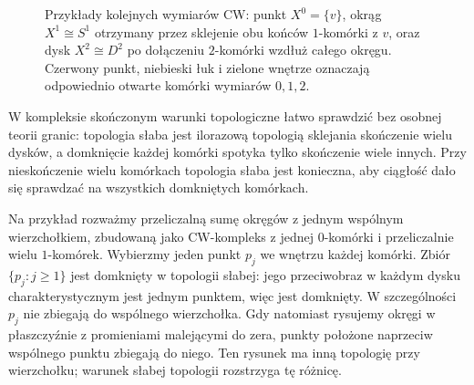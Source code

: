 \begin{figure}[!htbp]
\centering
{}
\caption{Przykłady kolejnych wymiarów CW: punkt
$X^0=\{v\}$, okrąg $X^1\cong S^1$ otrzymany
przez sklejenie obu końców $1$-komórki z $v$,
oraz dysk $X^2\cong D^2$ po dołączeniu
$2$-komórki wzdłuż całego okręgu.
Czerwony punkt, niebieski łuk i zielone wnętrze
oznaczają odpowiednio otwarte komórki
wymiarów $0,1,2$.}
\label{fig:cw-wymiary}
\end{figure}

W kompleksie skończonym warunki
topologiczne łatwo sprawdzić
bez osobnej teorii granic:
topologia słaba jest ilorazową
topologią sklejania skończenie
wielu dysków, a domknięcie
każdej komórki spotyka
tylko skończenie wiele innych.
Przy nieskończenie wielu komórkach
topologia słaba jest konieczna,
aby ciągłość dało się sprawdzać
na wszystkich domkniętych komórkach.

Na przykład rozważmy przeliczalną sumę okręgów z jednym
wspólnym wierzchołkiem, zbudowaną jako CW-kompleks z
jednej $0$-komórki i przeliczalnie wielu $1$-komórek.
Wybierzmy jeden punkt $p_j$ we wnętrzu każdej komórki.
Zbiór $\{p_j:j\geq1\}$ jest domknięty w topologii słabej:
jego przeciwobraz w każdym dysku charakterystycznym jest
jednym punktem, więc jest domknięty. W szczególności
$p_j$ nie zbiegają do wspólnego wierzchołka. Gdy natomiast
rysujemy okręgi w płaszczyźnie z promieniami malejącymi do
zera, punkty położone naprzeciw wspólnego punktu zbiegają
do niego. Ten rysunek ma inną topologię przy wierzchołku;
warunek słabej topologii rozstrzyga tę różnicę.

